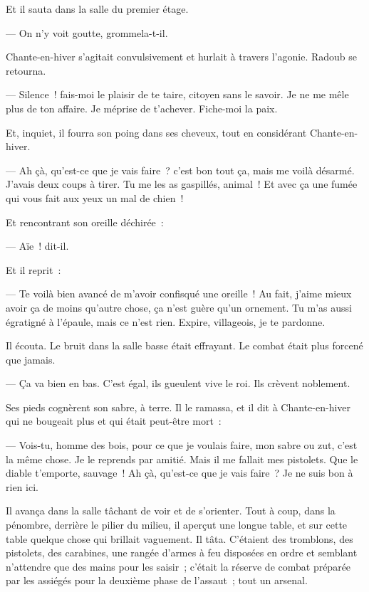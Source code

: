 \documentclass[french,twoside]{book} %
\begin{document}
Et il sauta dans la salle du premier étage.\par
 — On n’y voit goutte, grommela-t-il.\par
Chante-en-hiver s’agitait convulsivement et hurlait à travers l’agonie. Radoub se retourna.\par
— Silence ! fais-moi le plaisir de te taire, citoyen sans le savoir. Je ne me mêle plus de ton affaire. Je méprise de t’achever. Fiche-moi la paix.\par
Et, inquiet, il fourra son poing dans ses cheveux, tout en considérant Chante-en-hiver.\par
— Ah çà, qu’est-ce que je vais faire ? c’est bon tout ça, mais me voilà désarmé. J’avais deux coups à tirer. Tu me les as gaspillés, animal ! Et avec ça une fumée qui vous fait aux yeux un mal de chien !\par
Et rencontrant son oreille déchirée :\par
— Aïe ! dit-il.\par
Et il reprit :\par
— Te voilà bien avancé de m’avoir confisqué une oreille ! Au fait, j’aime mieux avoir ça de moins qu’autre chose, ça n’est guère qu’un ornement. Tu m’as aussi égratigné à l’épaule, mais ce n’est rien. Expire, villageois, je te pardonne.\par
Il écouta. Le bruit dans la salle basse était effrayant. Le combat était plus forcené que jamais.\par
— Ça va bien en bas. C’est égal, ils gueulent vive le roi. Ils crèvent noblement.\par
Ses pieds cognèrent son sabre, à terre. Il le ramassa, et il dit à Chante-en-hiver qui ne bougeait plus et qui était peut-être mort :\par
— Vois-tu, homme des bois, pour ce que je voulais faire, mon sabre ou zut, c’est la même chose. Je le reprends par amitié. Mais il me fallait mes pistolets.  Que le diable t’emporte, sauvage ! Ah çà, qu’est-ce que je vais faire ? Je ne suis bon à rien ici.\par
Il avança dans la salle tâchant de voir et de s’orienter. Tout à coup, dans la pénombre, derrière le pilier du milieu, il aperçut une longue table, et sur cette table quelque chose qui brillait vaguement. Il tâta. C’étaient des tromblons, des pistolets, des carabines, une rangée d’armes à feu disposées en ordre et semblant n’attendre que des mains pour les saisir ; c’était la réserve de combat préparée par les assiégés pour la deuxième phase de l’assaut ; tout un arsenal.\par
\end{document}
